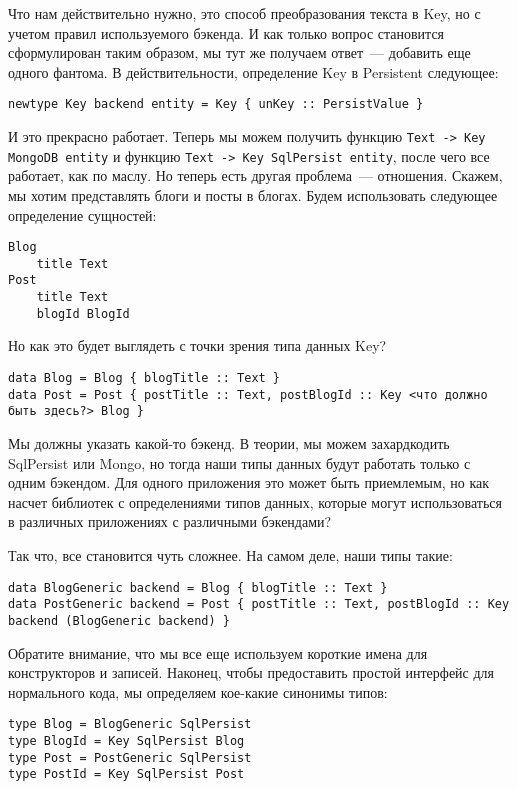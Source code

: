 Что нам действительно нужно, это способ преобразования текста в Key, но с учетом правил используемого бэкенда. И как только вопрос становится сформулирован таким образом, мы тут же получаем ответ~--- добавить еще одного фантома. В действительности, определение Key в Persistent следующее:

\begin{lstlisting}
newtype Key backend entity = Key { unKey :: PersistValue }
\end{lstlisting}

И это прекрасно работает. Теперь мы можем получить функцию \lstinline'Text -> Key MongoDB entity' и функцию \lstinline'Text -> Key SqlPersist entity', после чего все работает, как по маслу. Но теперь есть другая проблема~--- отношения. Скажем, мы хотим представлять блоги и посты в блогах. Будем использовать следующее определение сущностей:

\begin{lstlisting}
Blog
    title Text
Post
    title Text
    blogId BlogId
\end{lstlisting}

Но как это будет выглядеть с точки зрения типа данных Key?

\begin{lstlisting}
data Blog = Blog { blogTitle :: Text }
data Post = Post { postTitle :: Text, postBlogId :: Key <что должно быть здесь?> Blog }
\end{lstlisting}

Мы должны указать какой-то бэкенд. В теории, мы можем захардкодить SqlPersist или Mongo, но тогда наши типы данных будут работать только с одним бэкендом. Для одного приложения это может быть приемлемым, но как насчет библиотек с определениями типов данных, которые могут использоваться в различных приложениях с различными бэкендами?

Так что, все становится чуть сложнее. На самом деле, наши типы такие:

\begin{lstlisting}
data BlogGeneric backend = Blog { blogTitle :: Text }
data PostGeneric backend = Post { postTitle :: Text, postBlogId :: Key backend (BlogGeneric backend) }
\end{lstlisting}

Обратите внимание, что мы все еще используем короткие имена для конструкторов и записей. Наконец, чтобы предоставить простой интерфейс для нормального кода, мы определяем кое-какие синонимы типов:

\begin{lstlisting}
type Blog = BlogGeneric SqlPersist
type BlogId = Key SqlPersist Blog
type Post = PostGeneric SqlPersist
type PostId = Key SqlPersist Post
\end{lstlisting}

